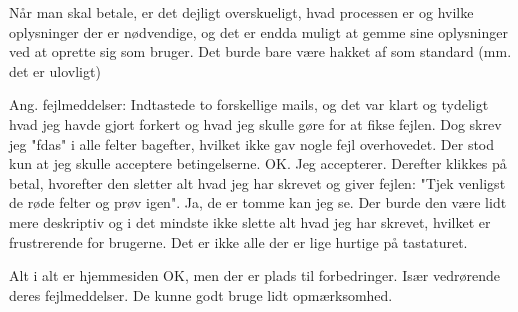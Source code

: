 \documentclass[12pt,a4paper,oneside]{article}
\begin{document}
Når man skal betale, er det dejligt overskueligt, hvad processen er og hvilke oplysninger der er nødvendige, og det er endda muligt at gemme sine oplysninger ved at oprette sig som bruger. Det burde bare være hakket af som standard (mm. det er ulovligt)\newline

Ang. fejlmeddelser: Indtastede to forskellige mails, og det var klart og tydeligt hvad jeg havde gjort forkert og hvad jeg skulle gøre for at fikse fejlen. Dog skrev jeg "fdas" i alle felter bagefter, hvilket ikke gav nogle fejl overhovedet. Der stod kun at jeg skulle acceptere betingelserne. OK. Jeg accepterer. Derefter klikkes på betal, hvorefter den sletter alt hvad jeg har skrevet og giver fejlen: "Tjek venligst de røde felter og prøv igen". Ja, de er tomme kan jeg se. Der burde den være lidt mere deskriptiv og i det mindste ikke slette alt hvad jeg har skrevet, hvilket er frustrerende for brugerne. Det er ikke alle der er lige hurtige på tastaturet.\newline

Alt i alt er hjemmesiden OK, men der er plads til forbedringer. Især vedrørende deres fejlmeddelser. De kunne godt bruge lidt opmærksomhed.
\end{document}
